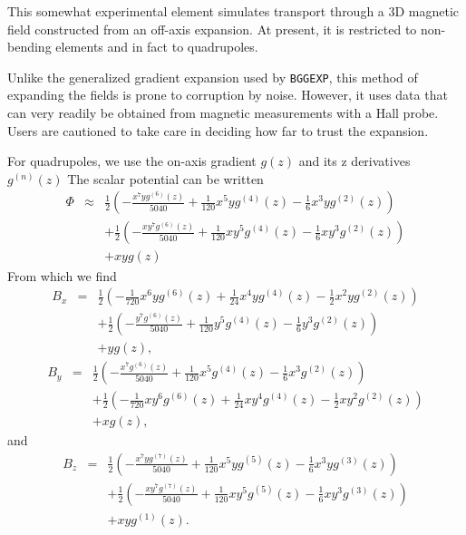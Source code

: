 This somewhat experimental element simulates transport through a 3D magnetic field constructed from
an off-axis expansion.
At present, it is restricted to non-bending elements and in fact to quadrupoles.

Unlike the generalized gradient expansion used by \verb|BGGEXP|, this method of expanding the fields is
prone to corruption by noise.
However, it uses data that can very readily be obtained from magnetic measurements with a Hall probe.
Users are cautioned to take care in deciding how far to trust the expansion.

For quadrupoles, we use the on-axis gradient $g(z)$ and its z derivatives $g^{(n)}(z)$
The scalar potential can be written 
\begin{eqnarray}
\Phi & \approx & \frac{1}{2} \left(-\frac{x^7 y g^{(6)}(z)}{5040}+\frac{1}{120} x^5 y g^{(4)}(z)-\frac{1}{6} x^3 y g^{(2)}(z)\right) \\
 & &  +\frac{1}{2} \left(-\frac{x y^7 g^{(6)}(z)}{5040}+\frac{1}{120} x y^5 g^{(4)}(z)-\frac{1}{6} x y^3 g^{(2)}(z)\right) \\
 & & + x y g(z)
\end{eqnarray}
From which we find
\begin{eqnarray}
B_x & = & \frac{1}{2} \left(-\frac{1}{720} x^6 y g^{(6)}(z)+\frac{1}{24} x^4 y g^{(4)}(z)-\frac{1}{2} x^2 y g^{(2)}(z)\right) \\
 & & + \frac{1}{2} \left(-\frac{y^7 g^{(6)}(z)}{5040}+\frac{1}{120} y^5 g^{(4)}(z)-\frac{1}{6} y^3 g^{(2)}(z)\right) \\ 
 & & +y g(z),
\end{eqnarray}
\begin{eqnarray}
B_y & = & \frac{1}{2} \left(-\frac{x^7 g^{(6)}(z)}{5040}+\frac{1}{120} x^5 g^{(4)}(z)-\frac{1}{6} x^3 g^{(2)}(z)\right) \\
& & + \frac{1}{2}  \left(-\frac{1}{720} x y^6 g^{(6)}(z)+\frac{1}{24} x y^4 g^{(4)}(z)-\frac{1}{2} x y^2 g^{(2)}(z)\right) \\
& & +x g(z),
\end{eqnarray}
and
\begin{eqnarray}
B_z & = & \frac{1}{2} \left(-\frac{x^7 y g^{(7)}(z)}{5040}+\frac{1}{120} x^5 y g^{(5)}(z)-\frac{1}{6} x^3 y g^{(3)}(z)\right) \\
& &  + \frac{1}{2} \left(-\frac{x y^7 g^{(7)}(z)}{5040}+\frac{1}{120} x y^5 g^{(5)}(z)-\frac{1}{6} x y^3 g^{(3)}(z)\right) \\
& & + x y g^{(1)}(z).
\end{eqnarray}

